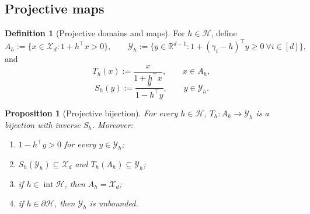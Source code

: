 \documentclass[11pt]{amsart}
\newtheorem{proposition}[proposition]{Proposition}
\theoremstyle{definition}
\newtheorem{definition}[definition]{Definition}
\newcommand{\R}{\mathbb R}
\newcommand{\cX}{\mathcal X}
\newcommand{\cY}{\mathcal Y}
\newcommand{\cH}{\mathcal H}
\begin{document}
\subsection{Projective maps}

\begin{definition}[Projective domains and maps]
For $h\in\cH$, define
\[
A_h:=\{x\in\cX_d:1+h^\top x>0\},
\qquad
\cY_h:=\{y\in\R^{d-1}:1+(\gamma_i-h)^\top y\ge 0\ \forall i\in[d]\},
\]
and
\[
T_h(x):=\frac{x}{1+h^\top x},\qquad x\in A_h,
\]
\[
S_h(y):=\frac{y}{1-h^\top y},\qquad y\in\cY_h.
\]
\end{definition}

\begin{proposition}[Projective bijection]\label{prop:diffeo}
For every $h\in\cH$, $T_h:A_h\to\cY_h$ is a bijection with inverse $S_h$. Moreover:
\begin{enumerate}[label=\textup{(\roman*)}]
\item $1-h^\top y>0$ for every $y\in\cY_h$;
\item $S_h(\cY_h)\subseteq\cX_d$ and $T_h(A_h)\subseteq\cY_h$;
\item if $h\in\operatorname{int}\cH$, then $A_h=\cX_d$;
\item if $h\in\partial \cH$, then $\cY_h$ is unbounded.
\end{enumerate}
\end{proposition}
\end{document}
